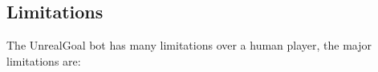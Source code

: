 \documentclass[11pt,a4paper]{article}
\newcommand{\Goal}{\textsc{Goal}}
\begin{document}





\subsection{Limitations}
The UnrealGoal bot has many limitations over a human player, the major limitations are:
\end{document}
